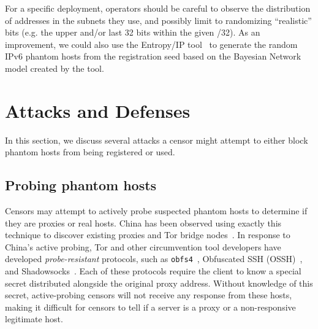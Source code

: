 \documentclass[sigconf,anonymous]{acmart}
\begin{document}
For a specific deployment, operators should be careful to observe the distribution of
addresses in the subnets they use, and possibly limit to randomizing ``realistic''
bits (e.g. the upper and/or last 32 bits within the given /32).
As an improvement, we could also use the Entropy/IP
tool~\cite{foremski2016entropy} to generate the random IPv6 phantom hosts from
the registration seed based on the Bayesian Network model created by the tool.



\section{Attacks and Defenses}
\label{sec:attacks}

In this section, we discuss several attacks a censor might attempt to either
block phantom hosts from being registered or used.


\subsection{Probing phantom hosts}
Censors may attempt to actively probe suspected phantom hosts to determine if
they are proxies or real hosts. China has been observed using exactly this technique to
discover existing proxies and Tor bridge
nodes~\cite{tor-bridge-blocking-blog,active-probe,ensafi-tor,china-blocking-tor}.
In response to China's active probing, Tor and other circumvention tool developers have developed
\emph{probe-resistant} protocols, such as \texttt{obfs4}~\cite{obfs4}, Obfuscated SSH
(OSSH)~\cite{ossh}, and Shadowsocks~\cite{shadowsocks}. Each of these protocols
require the client to know a special secret distributed alongside the original
proxy address. Without knowledge of this secret, active-probing censors will not
receive any response from these hosts, making it difficult for censors to tell if
a server is a proxy or a non-responsive legitimate host.
\end{document}
